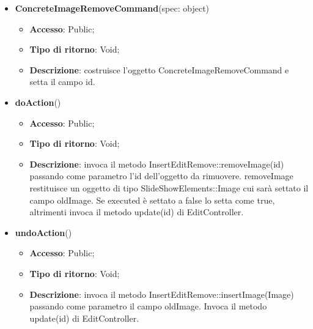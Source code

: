 {{{	
	\begin{itemize}
		\item \textbf{ConcreteImageRemoveCommand}(spec: object)
		\begin{itemize}
			\item \textbf{Accesso}: Public;
			\item \textbf{Tipo di ritorno}: Void;
			\item \textbf{Descrizione}: costruisce l’oggetto ConcreteImageRemoveCommand e setta il campo id.
		\end{itemize}
		\item \textbf{doAction}()
		\begin{itemize}
			\item \textbf{Accesso}: Public;
			\item \textbf{Tipo di ritorno}: Void;
			\item \textbf{Descrizione}: invoca il metodo InsertEditRemove::removeImage(id) passando come parametro l’id dell’oggetto da rimuovere. removeImage restituisce un oggetto di tipo SlideShowElements::Image cui sarà settato il campo oldImage. Se executed è settato a false lo setta come true, altrimenti invoca il metodo update(id) di EditController.
		\end{itemize}
		\item \textbf{undoAction}()
		\begin{itemize}
			\item \textbf{Accesso}: Public;
			\item \textbf{Tipo di ritorno}: Void;
			\item \textbf{Descrizione}: invoca il metodo InsertEditRemove::insertImage(Image) passando come parametro il campo oldImage. Invoca il metodo update(id) di EditController.
		\end{itemize}
	\end{itemize}
	}
}}
